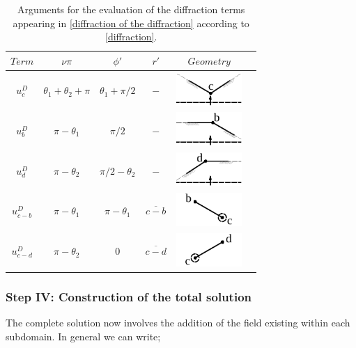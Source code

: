 \documentclass[11pt,letterpaper]{article}
\begin{document}
\begin{table}[H]
\begin{center}
    \begin{tabular}{ | c | c | c | c | c | p{10cm} |}
    \hline
     $Term$ & $\nu \pi$ & $\phi'$ & $r'$ & $Geometry$ \\ \hline
    $u^D_c$ & $\theta_1+\theta_2+\pi$ & $\theta_1+\pi/2$ & $-$ & \includegraphics[width=2.5cm]{IMAGES/wc.pdf} \\ \hline
    $u^D_b$ & $\pi-\theta_1$ & $\pi/2$ & $-$ & \includegraphics[width=2.5cm]{IMAGES/wb.pdf} \\ \hline
    $u^D_d$ & $\pi-\theta_2$ & $\pi/2-\theta_2$ & $-$ & \includegraphics[width=2.5cm]{IMAGES/wd.pdf} \\ \hline
    $u^D_{c-b}$ & $\pi-\theta_1$ & $\pi-\theta_1$ & $\overline{c-b}$ & \includegraphics[width=2.5cm]{IMAGES/wcb.pdf} \\ \hline
    $u^D_{c-d}$ & $\pi-\theta_2$ & $0$ & $\overline{c-d}$ & \includegraphics[width=2.5cm]{IMAGES/wcd.pdf} \\ \hline 
   \end{tabular}
\end{center}
\caption {Arguments for the evaluation of the diffraction terms appearing in \cref{diffraction of the diffraction} according to \cref{diffraction}.} \label{tab:high order} 
\end{table}

\subsubsection*{Step IV: Construction of the total solution}
The complete solution now involves the addition of the field existing within each subdomain. In general we can write;
\end{document}
